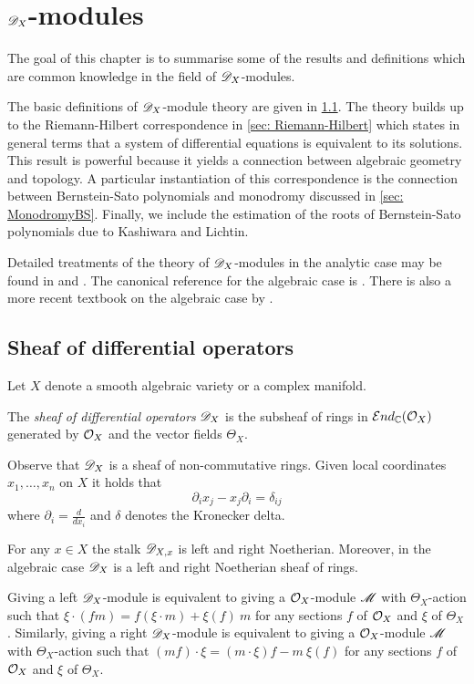 \chapter{$\mathscr{D}_X$-modules}\label{Ch: ChapterDX}
The goal of this chapter is to summarise some of the results and definitions which are common knowledge in the field of $\mathscr{D}_X$-modules.

The basic definitions of $\mathscr{D}_X$-module theory are given in \cref{sec: SheafOfDiff}.
The theory builds up to the Riemann-Hilbert correspondence in \cref{sec: Riemann-Hilbert} which states in general terms that a system of differential equations is equivalent to its solutions.
This result is powerful because it yields a connection between algebraic geometry and topology.
A particular instantiation of this correspondence is the connection between Bernstein-Sato polynomials and monodromy discussed in \cref{sec: MonodromyBS}.
Finally, we include the estimation of the roots of Bernstein-Sato polynomials due to Kashiwara and Lichtin.

Detailed treatments of the theory of $\mathscr{D}_X$-modules in the analytic case may be found in  \cite{bjork1979rings} and \cite{kashiwara2003d}. 
The canonical reference for the algebraic case is \cite{borel1987algebraic}. 
There is also a more recent textbook on the algebraic case by \cite{hotta2007d}.
\section{Sheaf of differential operators}\label{sec: SheafOfDiff}
Let $X$ denote a smooth algebraic variety or a complex manifold.
\begin{definition}
  The {\it sheaf of differential operators} $\mathscr{D}_X$ is the subsheaf of rings in $\mathcal{E}nd_{\mathbb{C}}(\mathcal{O}_X)$ generated by $\mathcal{O}_X$ and the vector fields $\Theta_X$.
\end{definition}
Observe that $\mathscr{D}_X$ is a sheaf of non-commutative rings.
Given local coordinates $x_1,\ldots, x_n$ on $X$ it holds that
$$\partial_i x_j - x_j\partial_i = \delta_{ij} $$
where $\partial_i= \frac{d}{dx_i}$ and $\delta$ denotes the Kronecker delta.
\begin{lemma}{\cite[Proposition 1.4.6., Theorem 4.1.2]{hotta2007d}}\label{lem: Noetherian}
  For any $x\in X$ the stalk $\mathscr{D}_{X,x}$ is left and right Noetherian. Moreover, in the algebraic case $\mathscr{D}_X$ is a left and right Noetherian sheaf of rings.
\end{lemma}
Giving a left $\mathscr{D}_X$-module is equivalent to giving a $\mathcal{O}_X$-module $\mathscr{M}$ with $\Theta_X$-action such that
$\xi\cdot (fm) = f (\xi \cdot m)  + \xi(f)\ m  $
for any sections $f$ of $\mathcal{O}_X$ and $\xi$ of $\Theta_X$. Similarly, giving a right $\mathscr{D}_X$-module is equivalent to giving a $\mathcal{O}_X$-module $\mathscr{M}$ with $\Theta_X$-action such that
$(mf)\cdot\xi = (m\cdot\xi)f - m\ \xi(f) $ for any sections $f$ of $\mathcal{O}_X$ and $\xi$ of $\Theta_X$.

